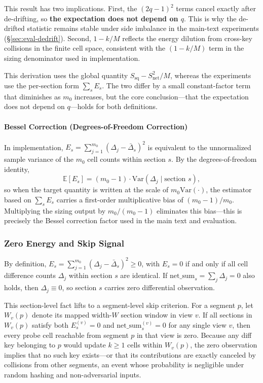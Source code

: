 This result has two implications. First, the $(2q-1)^2$ terms cancel exactly after de-drifting, so \textbf{the expectation does not depend on $q$}. This is why the de-drifted statistic remains stable under side imbalance in the main-text experiments (\S\ref{sec:eval-dedrift}). Second, $1-k/M$ reflects the energy dilution from cross-key collisions in the finite cell space, consistent with the $(1-k/M)$ term in the sizing denominator used in implementation.

This derivation uses the global quantity $S_{\text{sq}}-S_{\text{net}}^2/M$, whereas the experiments use the per-section form $\sum_s E_s$. The two differ by a small constant-factor term that diminishes as $m_0$ increases, but the core conclusion---that the expectation does not depend on $q$---holds for both definitions.

\paragraph{Bessel Correction (Degrees-of-Freedom Correction)}
In implementation, $E_s=\sum_{j=1}^{m_0}(\Delta_j-\bar{\Delta}_s)^2$ is equivalent to the unnormalized sample variance of the $m_0$ cell counts within section $s$. By the degrees-of-freedom identity,
\[
\mathbb{E}[E_s]=(m_0-1)\cdot \mathrm{Var}(\Delta_j\mid \text{section }s),
\]
so when the target quantity is written at the scale of $m_0 \mathrm{Var}(\cdot)$, the estimator based on $\sum_s E_s$ carries a first-order multiplicative bias of $(m_0-1)/m_0$. Multiplying the sizing output by $m_0/(m_0-1)$ eliminates this bias---this is precisely the Bessel correction factor used in the main text and evaluation.

\subsubsection{Zero Energy and Skip Signal}
\label{sec:appendix-sizing-zero-energy}

By definition, $E_s=\sum_{j=1}^{m_0}(\Delta_j-\bar{\Delta}_s)^2\ge 0$, with $E_s=0$ if and only if all cell difference counts $\Delta_j$ within section $s$ are identical.
If $\mathrm{net\_sum}_s=\sum_j \Delta_j=0$ also holds, then $\Delta_j\equiv 0$, so section $s$ carries zero differential observation.

This section-level fact lifts to a segment-level skip criterion. For a segment $p$, let $W_v(p)$ denote its mapped width-$W$ section window in view $v$. If all sections in $W_v(p)$ satisfy both $E_s^{(v)}{=}0$ and $\mathrm{net\_sum}_s^{(v)}{=}0$ for any single view $v$, then every probe cell reachable from segment $p$ in that view is zero. Because any diff key belonging to $p$ would update $k\ge 1$ cells within $W_v(p)$, the zero observation implies that no such key exists---or that its contributions are exactly canceled by collisions from other segments, an event whose probability is negligible under random hashing and non-adversarial inputs.

